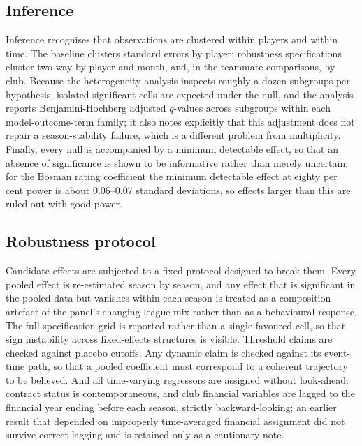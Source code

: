 \subsection{Inference}
\label{sec:strategy-inference}

Inference recognises that observations are clustered within players and within
time. The baseline clusters standard errors by player; robustness specifications
cluster two-way by player and month, and, in the teammate comparisons, by club.
Because the heterogeneity analysis inspects roughly a dozen subgroups per
hypothesis, isolated significant cells are expected under the null, and the analysis
reports Benjamini-Hochberg adjusted $q$-values across subgroups within each
model-outcome-term family; it also notes explicitly that this adjustment does not
repair a season-stability failure, which is a different problem from multiplicity.
Finally, every null is accompanied by a minimum detectable effect, so that an
absence of significance is shown to be informative rather than merely uncertain:
for the Bosman rating coefficient the minimum detectable effect at eighty per cent
power is about 0.06--0.07 standard deviations, so effects larger than this are ruled
out with good power.

\subsection{Robustness protocol}
\label{sec:strategy-robustness}

Candidate effects are subjected to a fixed protocol designed to break them. Every
pooled effect is re-estimated season by season, and any effect that is significant
in the pooled data but vanishes within each season is treated as a composition
artefact of the panel's changing league mix rather than as a behavioural response.
The full specification grid is reported rather than a single favoured cell, so that
sign instability across fixed-effects structures is visible. Threshold claims are
checked against placebo cutoffs. Any dynamic claim is checked against its event-time
path, so that a pooled coefficient must correspond to a coherent trajectory to be
believed. And all time-varying regressors are assigned without look-ahead: contract
status is contemporaneous, and club financial variables are lagged to the financial
year ending before each season, strictly backward-looking; an earlier result that
depended on improperly time-averaged financial assignment did not survive correct
lagging and is retained only as a cautionary note.

